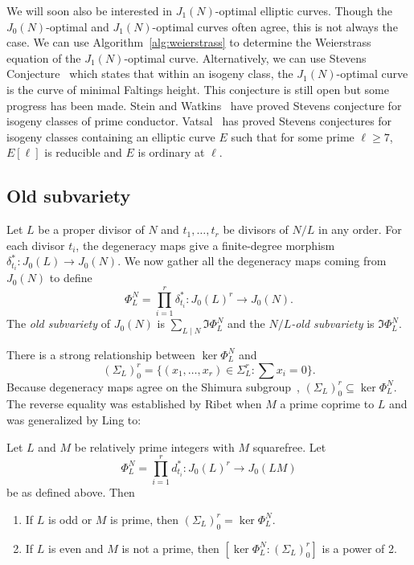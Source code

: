 We will soon also be interested in $J_1(N)$-optimal elliptic curves. Though the
$J_0(N)$-optimal and $J_1(N)$-optimal curves often agree, this is not always
the case. We can use Algorithm~\ref{alg:weierstrass} to determine the
Weierstrass equation of the $J_1(N)$-optimal curve. Alternatively, we can use
Stevens Conjecture~\cite[Conjecture II]{stevens:param} which states that within
an isogeny class, the $J_1(N)$-optimal curve is the curve of minimal Faltings
height. This conjecture is still open but some progress has been made. Stein
and Watkins~\cite[\S 3]{stein-watkins:ns} have proved Stevens conjecture for
isogeny classes of prime conductor. Vatsal~\cite[Thm.
1.11]{vatsal:multiplicative} has proved Stevens conjectures for isogeny classes
containing an elliptic curve $E$ such that for some prime $\ell\geq 7$,
$E[\ell]$ is reducible and $E$ is ordinary at $\ell$.

\subsection{Old subvariety}%
\label{sub:old_subvariety}

Let $L$ be a proper divisor of $N$ and $t_1,\ldots,t_r$ be divisors of $N/L$ in
any order. For each divisor $t_i$, the degeneracy maps give a finite-degree
morphism $\delta_{t_i} ^*:J_0(L)\to J_0(N)$. We now gather all the degeneracy
maps coming from $J_0(N)$ to define
\[
    \Phi_L ^N = \prod_{i=1} ^r \delta_{t_i} ^* : J_0(L)^r \to J_0(N).
\]
The \emph{old subvariety} of $J_0(N)$ is $\sum_{L\mid N} \Im\Phi_L ^N$ and the
\emph{$N/L$-old subvariety} is $\Im\Phi_L ^N$.

There is a strong relationship between $\ker \Phi_L ^N$ and
\[
    (\Sigma_L)_0 ^r =\{(x_1,\ldots,x_r)\in \Sigma_L ^r: \sum x_i = 0\}.
\]
Because degeneracy maps agree on the Shimura subgroup~\cite[Theorem
4]{ling-oesterle:shimura}, $(\Sigma_L)_0 ^r \subseteq \ker\Phi_L ^N$. The
reverse equality was established by Ribet when $M$ a prime coprime to $L$ and
was generalized by Ling to:
\begin{theorem}
    \label{thm:ribet-ling}
    Let $L$ and $M$ be relatively prime integers with $M$ squarefree. Let
    \[
        \Phi_L ^N = \prod_{i=1} ^r d_{t_i} ^* : J_0(L)^r \to J_0(LM)
    \]
    be as defined above. Then
    \begin{enumerate}
        \item
            If $L$ is odd or $M$ is prime, then $(\Sigma_L)_0 ^r=\ker\Phi_L ^N$.
        \item
            If $L$ is even and $M$ is not a prime, then $[\ker\Phi_L ^N:
            (\Sigma_L)_0 ^r]$ is a power of 2.
    \end{enumerate}
\end{theorem}

